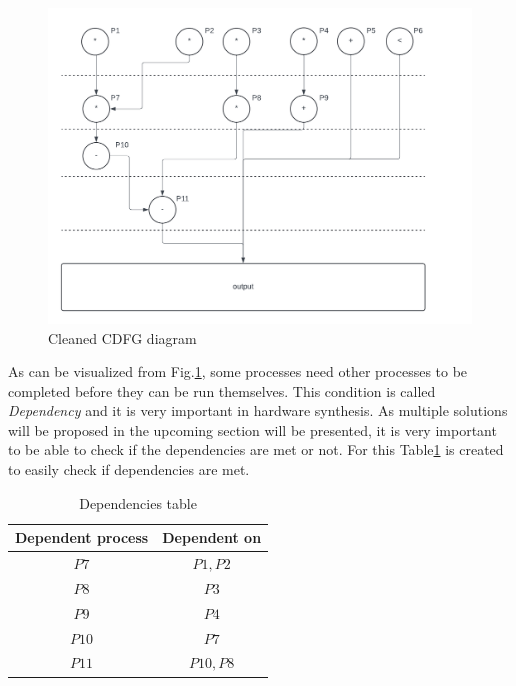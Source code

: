 \documentclass[conference]{IEEEtran}
\begin{document}
\begin{figure}[h]
    \centering
    \includegraphics[scale=0.4]{CDFG CLEANED.png}
    \caption{Cleaned CDFG diagram}
    \label{fig:cdfg_cleaned}
\end{figure}

As can be visualized from Fig.\ref{fig:cdfg_cleaned}, some processes need other processes to be completed before they can be run themselves. This condition is called \textit{Dependency} and it is very important in hardware synthesis. As multiple solutions will be proposed in the upcoming section will be presented, it is very important to be able to check if the dependencies are met or not. For this Table\ref{tab:Dependencies} is created to easily check if dependencies are met.
\begin{table}
    \centering
    \begin{tabular}{|c|c|}
    \hline
       Dependent process  & Dependent on \\
       \hline \hline
       $P7$  &  $P1,P2$ \\
       \hline
        $P8$ & $P3$ \\
        \hline
       $P9$ & $P4$ \\
       \hline
       $P10$ & $P7$ \\
       \hline
       $P11$ & $P10,P8$ \\
       \hline
    \end{tabular}
    \vspace{2pt}
    \caption{Dependencies table}
    \label{tab:Dependencies}
\end{table}
\end{document}
